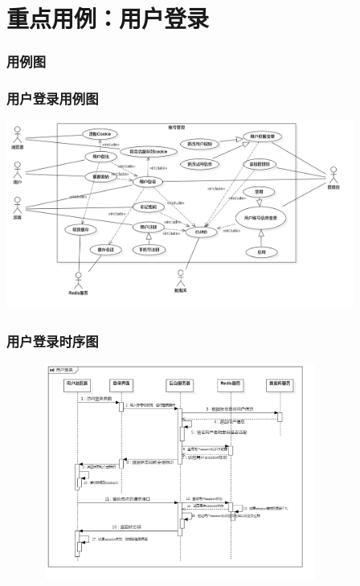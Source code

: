\section{重点用例：用户登录}
\begin{frame}
    \frametitle{用例图}
    \frametitle{用户登录用例图}
    \center
    \includegraphics[width=4.5in]{contents/figure/login_usecase_diagram.png}
\end{frame}
\begin{frame}
    \frametitle{用户登录时序图}
    \center
    \includegraphics[width=4.5in,height=2.8in]{contents/figure/login_sequence_diagram.png}
\end{frame}